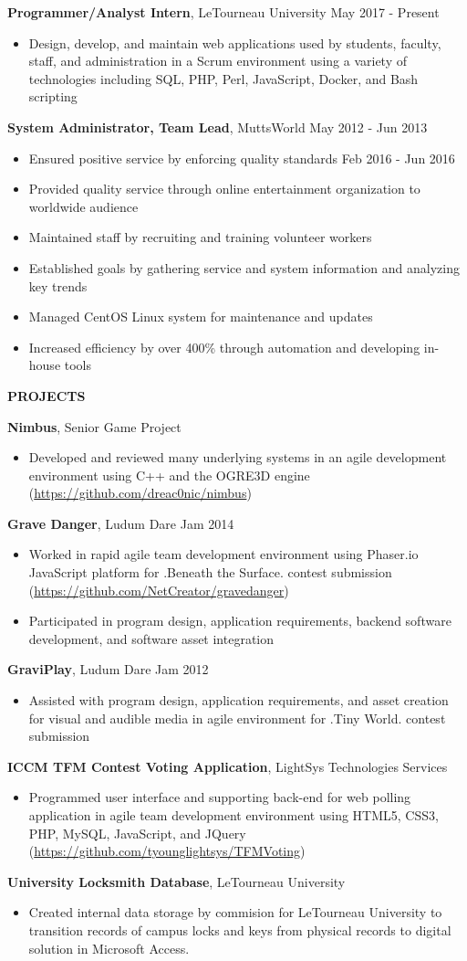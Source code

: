 \documentclass[letterpaper]{article}
\newcommand{\altsection}[1]{\noindent\textbf{#1}\smallskip}
\newcommand{\entry}[3]{\textbf{#1}, #2\begin{itemize}[leftmargin=3.5em]#3\end{itemize}\bigskip}
\begin{document}
\entry{Programmer/Analyst Intern}{LeTourneau University                 \hfill          May 2017 - Present} {
    \item Design, develop, and maintain web applications used by students, faculty, staff, and administration in a Scrum environment using a variety of technologies including SQL, PHP, Perl, JavaScript, Docker, and Bash scripting
}

\entry{System Administrator, Team Lead}{MuttsWorld                             \hfill          May 2012 - Jun 2013} {
    \item Ensured positive service by enforcing quality standards       \hfill          Feb 2016 - Jun 2016
    \item Provided quality service through online entertainment organization to worldwide audience
    \item Maintained staff by recruiting and training volunteer workers
    \item Established goals by gathering service and system information and analyzing key trends
    \item Managed CentOS Linux system for maintenance and updates
    \item Increased efficiency by over 400\% through automation and developing in-house tools
}

\altsection{PROJECTS}

\entry{Nimbus}{Senior Game Project} {
    \item Developed and reviewed many underlying systems in an agile development environment using C++ and the OGRE3D engine (\url{https://github.com/dreac0nic/nimbus})
}

\entry{Grave Danger}{Ludum Dare Jam 2014} {
    \item Worked in rapid agile team development environment using Phaser.io JavaScript platform for .Beneath the Surface. contest submission (\url{https://github.com/NetCreator/gravedanger})
    \item Participated in program design, application requirements, backend software development, and software asset integration
}

\entry{GraviPlay}{Ludum Dare Jam 2012} {
    \item Assisted with program design, application requirements, and asset creation for visual and audible media in agile environment for .Tiny World. contest submission
}

\entry{ICCM TFM Contest Voting Application}{LightSys Technologies Services} {
    \item Programmed user interface and supporting back-end for web polling application in agile team development environment using HTML5, CSS3, PHP, MySQL, JavaScript, and JQuery (\url{https://github.com/tyounglightsys/TFMVoting})
}

\entry{University Locksmith Database}{LeTourneau University} {
    \item Created internal data storage by commision for LeTourneau University to transition records of campus locks and keys from physical records to digital solution in Microsoft Access.
}
\end{document}
